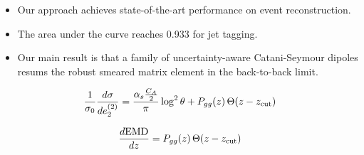 \begin{itemize}
  \item Our approach achieves state-of-the-art performance on event reconstruction.
  \item The area under the curve reaches 0.933 for jet tagging.
  \item Our main result is that a family of uncertainty-aware Catani-Seymour dipoles resums the robust smeared matrix element in the back-to-back limit.
\end{itemize}

\begin{equation}
  \frac{1}{\sigma_0} \frac{d\sigma}{de_2^{(2)}} = \frac{\alpha_s \frac{C_A}{2}}{\pi} \log^2 \theta + P_{gg}(z) \, \Theta(z - z_{\rm cut})
  \label{eq:3}
\end{equation}

\begin{equation}
  \frac{d \mathrm{EMD}}{d z} = P_{gg}(z) \, \Theta(z - z_{\rm cut})
  \label{eq:4}
\end{equation}

